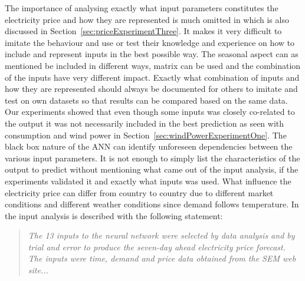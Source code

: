 The importance of analysing exactly what input parameters constitutes the electricity price and how they are represented is much omitted in\cite{ShortTermWindPowerForecasting,singhal2011electricity,szkuta1999electricity,sansom1999neural} which is also discussed in Section~\ref{sec:priceExperimentThree}. It makes it very difficult to imitate the behaviour and use or test their knowledge and experience on how to include and represent inputs in the best possible way. The seasonal aspect can as mentioned be included in different ways, matrix can be used and the combination of the inputs have very different impact. Exactly what combination of inputs and how they are represented should always be documented for others to imitate and test on own datasets so that results can be compared based on the same data. Our experiments showed that even though some inputs was closely co-related to the output it was not necessarily included in the best prediction as seen with consumption and wind power in Section~\ref{sec:windPowerExperimentOne}. The black box nature of the ANN can identify unforeseen dependencies between the various input parameters. It is not enough to simply list the characteristics of the output to predict without mentioning what came out of the input analysis, if the experiments validated it and exactly what inputs was used. What influence the electricity price can differ from country to country due to different market conditions and different weather conditions since demand follows temperature. In \cite{sansom1999neural} the input analysis is described with the following statement:

\begin{quotation}
\textit{The 13 inputs to the neural network were selected by data analysis and by trial and error to produce the seven-day ahead electricity price forecast. The inputs were time, demand and price data obtained from the SEM web site...}
\end{quotation}


